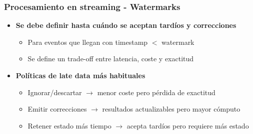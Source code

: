 \documentclass[aspectratio=169]{beamer}
\begin{document}
\begin{frame}
\frametitle{Procesamiento en streaming - Watermarks}
\begin{itemize}

  \item \textbf{Se debe definir hasta cuándo se aceptan tardíos y correcciones}
  \begin{itemize}
    \item Para eventos que llegan con timestamp $<$ watermark
    \item Se define un trade-off entre latencia, coste y exactitud
  \end{itemize}

  \vspace{1em}

  \item \textbf{Políticas de late data más habituales}
  \begin{itemize}
    \item Ignorar/descartar $\rightarrow$ menor coste pero pérdida de exactitud
    \item Emitir correcciones $\rightarrow$ resultados actualizables pero mayor cómputo
    \item Retener estado más tiempo $\rightarrow$ acepta tardíos pero requiere más estado
  \end{itemize}
\end{itemize}
\end{frame}
\end{document}
